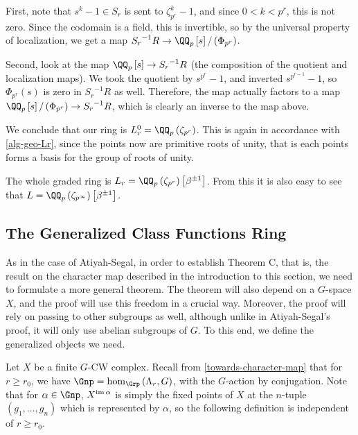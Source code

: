 \begin{example}
	First, note that $s^k-1 \in S_r$ is sent to $\zeta_{p^r}^k - 1$, and since $0 < k < p^r$, this is not zero.
	Since the codomain is a field, this is invertible, so by the universal property of localization, we get a map ${S_r}^{-1} R \to \QQ_p\left[s\right]/\left(\Phi_{p^r}\right)$.
	
	Second, look at the map $\QQ_p\left[s\right] \to {S_r}^{-1} R$ (the composition of the quotient and localization maps).
	We took the quotient by $s^{p^r} - 1$, and inverted $s^{p^{r-1}} - 1$, so $\Phi_{p^r}\left(s\right)$ is zero in ${S_r}^{-1} R$ as well.
	Therefore, the map actually factors to a map $\QQ_p\left[s\right]/\left(\Phi_{p^r}\right) \to {S_r}^{-1} R$, which is clearly an inverse to the map above.
	
	We conclude that our ring is $L_r^0 = \QQ_p\left(\zeta_{p^r}\right)$.
	This is again in accordance with \ref{alg-geo-Lr}, since the points now are primitive roots of unity, that is each points forms a basis for the group of roots of unity.
	
	The whole graded ring is $L_r = \QQ_p\left(\zeta_{p^r}\right)\left[\beta^{\pm 1}\right]$.
	From this it is also easy to see that $L = \QQ_p\left(\zeta_{p^\infty}\right)\left[\beta^{\pm 1}\right]$.
\end{example}



\subsection{The Generalized Class Functions Ring}

As in the case of Atiyah-Segal, in order to establish Theorem C, that is, the result on the character map described in the introduction to this section, we need to formulate a more general theorem.
The theorem will also depend on a $G$-space $X$, and the proof will use this freedom in a crucial way.
Moreover, the proof will rely on passing to other subgroups as well, although unlike in Atiyah-Segal's proof, it will only use abelian subgroups of $G$.
To this end, we define the generalized objects we need.

Let $X$ be a finite $G$-CW complex.
Recall from \ref{towards-character-map} that for $r \geq r_0$, we have $\Gnp = \hom_{\Grp}\left(\Lambda_r, G\right)$, with the $G$-action by conjugation.
Note that for $\alpha \in \Gnp$, $X^{\operatorname{im} \alpha}$ is simply the fixed points of $X$ at the $n$-tuple $\left(g_1, \dotsc, g_n\right)$ which is represented by $\alpha$, so the following definition is independent of $r \geq r_0$.

